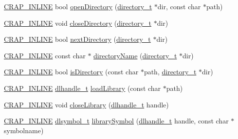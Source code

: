 \begin{DoxyCompactItemize}
\item 
\hyperlink{config__x86_8h_a5a40526b8d842e7ff731509998bb0f1c}{C\+R\+A\+P\+\_\+\+I\+N\+L\+I\+N\+E} bool \hyperlink{namespacecrap_aa5e6fb0d94b627139d54baa15235de7c}{open\+Directory} (\hyperlink{namespacecrap_a82911918170604f7fc9e93d66891069c}{directory\+\_\+t} $\ast$dir, const char $\ast$path)
\item 
\hyperlink{config__x86_8h_a5a40526b8d842e7ff731509998bb0f1c}{C\+R\+A\+P\+\_\+\+I\+N\+L\+I\+N\+E} void \hyperlink{namespacecrap_aafb3fe5f27c077088ed8fd540e59a4b6}{close\+Directory} (\hyperlink{namespacecrap_a82911918170604f7fc9e93d66891069c}{directory\+\_\+t} $\ast$dir)
\item 
\hyperlink{config__x86_8h_a5a40526b8d842e7ff731509998bb0f1c}{C\+R\+A\+P\+\_\+\+I\+N\+L\+I\+N\+E} bool \hyperlink{namespacecrap_a0daff76fe14bd465cad2439d3d8a5b39}{next\+Directory} (\hyperlink{namespacecrap_a82911918170604f7fc9e93d66891069c}{directory\+\_\+t} $\ast$dir)
\item 
\hyperlink{config__x86_8h_a5a40526b8d842e7ff731509998bb0f1c}{C\+R\+A\+P\+\_\+\+I\+N\+L\+I\+N\+E} const char $\ast$ \hyperlink{namespacecrap_adb591d0a2e2f6adc6526bfb4e5ae3d31}{directory\+Name} (\hyperlink{namespacecrap_a82911918170604f7fc9e93d66891069c}{directory\+\_\+t} $\ast$dir)
\item 
\hyperlink{config__x86_8h_a5a40526b8d842e7ff731509998bb0f1c}{C\+R\+A\+P\+\_\+\+I\+N\+L\+I\+N\+E} bool \hyperlink{namespacecrap_acd59c91fb08cbfd185081e18e650b404}{is\+Directory} (const char $\ast$path, \hyperlink{namespacecrap_a82911918170604f7fc9e93d66891069c}{directory\+\_\+t} $\ast$dir)
\item 
\hyperlink{config__x86_8h_a5a40526b8d842e7ff731509998bb0f1c}{C\+R\+A\+P\+\_\+\+I\+N\+L\+I\+N\+E} \hyperlink{namespacecrap_acee8e66495f007816233ce6b2da6465b}{dlhandle\+\_\+t} \hyperlink{namespacecrap_a2562c2174ac75b91414db38a199f115e}{load\+Library} (const char $\ast$path)
\item 
\hyperlink{config__x86_8h_a5a40526b8d842e7ff731509998bb0f1c}{C\+R\+A\+P\+\_\+\+I\+N\+L\+I\+N\+E} void \hyperlink{namespacecrap_aefd01bce928b74be6029473d7e7c0501}{close\+Library} (\hyperlink{namespacecrap_acee8e66495f007816233ce6b2da6465b}{dlhandle\+\_\+t} handle)
\item 
\hyperlink{config__x86_8h_a5a40526b8d842e7ff731509998bb0f1c}{C\+R\+A\+P\+\_\+\+I\+N\+L\+I\+N\+E} \hyperlink{namespacecrap_a2eba1ed085b0da868a3cd8b2d6a4f7e7}{dlsymbol\+\_\+t} \hyperlink{namespacecrap_a0b7c02b8efc3c8bf6d51391ef06b51d3}{library\+Symbol} (\hyperlink{namespacecrap_acee8e66495f007816233ce6b2da6465b}{dlhandle\+\_\+t} handle, const char $\ast$symbolname)

\end{DoxyCompactItemize}
